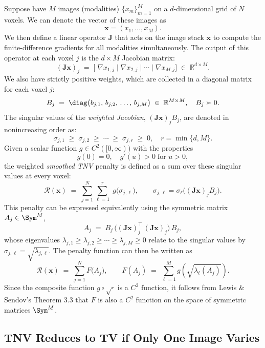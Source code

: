 Suppose have \(M\) images (modalities) \(\{x_m\}_{m=1}^M\) on a \(d\)-dimensional grid of \(N\) voxels. We can denote the vector of these images as
\[
  \mathbf{x} = (x_1,\dots,x_M).
\]
We then define a linear operator \(\mathbf{J}\) that acts on the image stack \(\mathbf{x}\) to compute the finite-difference gradients for all modalities simultaneously. The output of this operator at each voxel \(j\) is the \(d\times M\) Jacobian matrix:
\[
 (\mathbf{J}\mathbf{x})_j \;=\; \bigl[\;\nabla x_{1,j}\;\big|\;\nabla x_{2,j}\;\big|\;\cdots\;\big|\;\nabla x_{M,j}\bigr]
  \;\in\;\mathbb{R}^{d\times M}.
\]
We also have strictly positive weights, which are collected in a diagonal matrix for each voxel \(j\):
\[
  B_j \;=\; \diag\bigl(b_{j,1},\,b_{j,2},\,\dots,\,b_{j,M}\bigr)
  \;\in\;\mathbb{R}^{M\times M},
  \quad B_j \succ 0.
\]
The singular values of the \emph{weighted Jacobian}, \((\mathbf{J}\mathbf{x})_j B_j\), are denoted in nonincreasing order as:
\[
  \sigma_{j,1}\;\ge\;\sigma_{j,2}\;\ge\;\cdots\;\ge\;\sigma_{j,r}\;\ge\;0,
  \quad
  r = \min\{d,M\}.
\]
Given a scalar function \(g\in C^2([0,\infty))\) with the properties
\[
  g(0)=0,
  \quad
  g'(u)>0\;\text{for }u>0,
\]
the weighted \emph{smoothed TNV} penalty is defined as a sum over these singular values at every voxel:
\[
  \mathcal{R}(\mathbf{x})
  \;=\;
  \sum_{j=1}^N \sum_{\ell=1}^{r} \;g\bigl(\sigma_{j,\ell}\bigr),
  \qquad
  \sigma_{j,\ell} = \sigma_\ell\bigl( (\mathbf{J}\mathbf{x})_j B_j \bigr).
\]
This penalty can be expressed equivalently using the symmetric matrix \(A_j \in \Sym^M\),
\[
  A_j
  \;=\; B_j\,\bigl((\mathbf{J}\mathbf{x})_j^{\top}\,(\mathbf{J}\mathbf{x})_j\bigr)\,B_j,
\]
whose eigenvalues \(\lambda_{j,1}\ge\lambda_{j,2}\ge\cdots\ge\lambda_{j,M}\ge0\) relate to the singular values by \(\sigma_{j,\ell} = \sqrt{\lambda_{j,\ell}}\). The penalty function can then be written as
\[
  \mathcal{R}(\mathbf{x})
  \;=\;\sum_{j=1}^N F\bigl(A_j\bigr),
  \qquad
  F(A_j) \;=\;\sum_{\ell=1}^M g\left(\sqrt{\lambda_\ell(A_j)}\right).
\]
Since the composite function \(g\circ\sqrt{\cdot}\) is a \(C^2\) function, it follows from Lewis \& Sendov's Theorem 3.3 that \(F\) is also a \(C^2\) function on the space of symmetric matrices \(\Sym^M\).

\hrulefill

\subsection{TNV Reduces to TV if Only One Image Varies}

